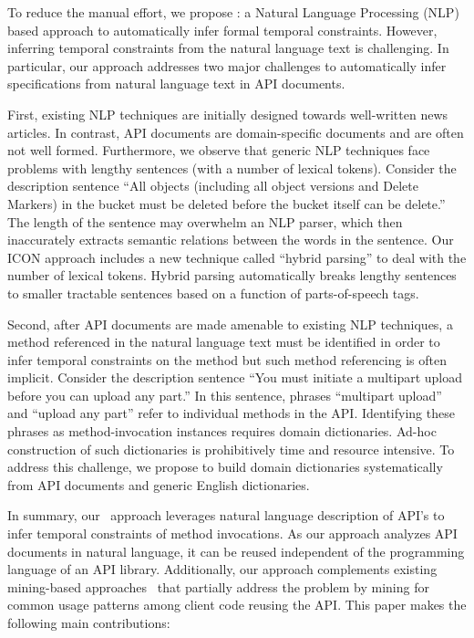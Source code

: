 To reduce the manual effort, we propose \tool: a Natural Language Processing (NLP) based approach
to automatically infer formal temporal constraints. 
However, inferring temporal constraints from the natural language text is challenging. 
In particular, our approach addresses two major challenges to automatically infer specifications
from natural language text in API documents.

First, existing NLP techniques are initially designed towards well-written news articles.
In contrast, API documents are domain-specific documents and are often not well formed.
Furthermore, we observe that generic NLP techniques face problems with lengthy sentences (with a number of lexical tokens).
Consider the description sentence ``All objects (including all object versions and Delete Markers) in the bucket must be deleted before the bucket itself can be delete.'' The length of the sentence may overwhelm an NLP parser, which then inaccurately extracts semantic relations between the words in the sentence.
Our ICON approach includes a new technique called ``hybrid parsing'' to deal with the number of lexical tokens.
Hybrid parsing automatically breaks lengthy sentences to smaller tractable sentences based on a function of parts-of-speech tags.   

Second, after API documents are made amenable to existing NLP techniques, a method referenced in the natural language text must be identified in order to infer temporal constraints on the method but such method referencing is often implicit.
Consider the description sentence ``You must initiate a multipart upload before you can upload any part.''
In this sentence, phrases ``multipart upload'' and ``upload any part'' refer to individual methods in the API.
Identifying these phrases as method-invocation instances requires domain dictionaries.
Ad-hoc construction of such dictionaries is prohibitively time and resource intensive.
To address this challenge, we propose to build domain dictionaries systematically from API documents and generic English dictionaries.  

In summary, our \tool\ approach leverages natural language description of API's to infer temporal constraints of method invocations.
As our approach analyzes API documents in natural language, it can be reused independent of the programming language of an API library.
Additionally, our approach complements existing mining-based approaches~\cite{buse2012synthesizing, thummalapenta07parseweb, Wang:2013:MSR, Zhong:2009:MMR} that partially address the problem by mining for common usage patterns among client code reusing the API.
This paper makes the following main contributions:

